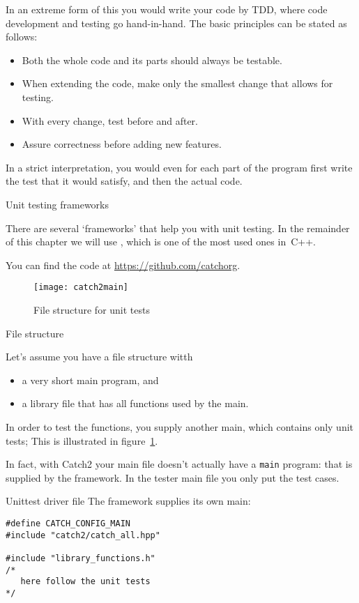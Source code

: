 In an extreme form of this you would write
your code by \acf{TDD}, where code development and testing
go hand-in-hand. The basic principles can be stated as follows:
\begin{itemize}
\item Both the whole code and its parts should always be testable.
\item When extending the code, make only the smallest change that allows for testing.
\item With every change, test before and after.
\item Assure correctness before adding new features.  
\end{itemize}
In a strict interpretation,
you would even for each part of the
program first write the test that it would satisfy,
and then the actual code.

 {Unit testing frameworks}
\label{sec:tdd}

There are several `frameworks' that help you with unit testing.
In the remainder of this chapter we will use ,
which is one of the most used ones in~C++.

You can find the code at \url{https://github.com/catchorg}.

\begin{figure}[t]
  \texttt{[image: catch2main]}
  \caption{File structure for unit tests}
  \label{fig:catch2main}
\end{figure}

 {File structure}

Let's assume you have a file structure witth
\begin{itemize}
\item a very short main program, and
\item a library file that has all functions used by the main.
\end{itemize}
In order to test the functions, you supply another main,
which contains only unit tests;  
This is illustrated in figure~\ref{fig:catch2main}.

In fact, with Catch2 your main file doesn't actually have
a \lstinline{main} program: that is supplied by the framework.
In the tester main file you only put the test cases.

\begin{block}{Unittest driver file}
  \label{sl:catch2main}
The framework supplies its own main:
\begin{lstlisting}
#define CATCH_CONFIG_MAIN
#include "catch2/catch_all.hpp"

#include "library_functions.h"
/*
   here follow the unit tests
*/
\end{lstlisting}
\end{block}

